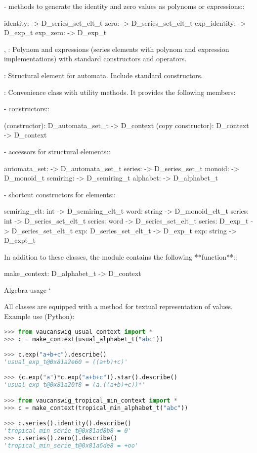       - methods to  generate the identity and zero  values as polynoms
        or expressions::

          identity: -> D\_series\_set\_elt\_t
          zero: -> D\_series\_set\_elt\_t
          exp\_identity: -> D\_exp\_t
          exp\_zero: -> D\_exp\_t

, : 
      Polynom  and  expressions  (series  elements  with  polynom  and
      expression implementations) with standard \Vauc constructors
      and operators.

:
      Structural  element  for  automata. Include  standard  \Vauc
      constructors.

:
      Convenience  class   with  utility  methods.   It  provides  the
      following members:

      - constructors::

         (constructor): D\_automata\_set\_t -> D\_context
         (copy constructor): D\_context -> D\_context

      - accessors for structural elements::

         automata\_set: -> D\_automata\_set\_t
         series: -> D\_series\_set\_t
         monoid: -> D\_monoid\_t
         semiring: -> D\_semiring\_t
         alphabet: -> D\_alphabet\_t

      - shortcut constructors for elements::

         semiring\_elt: int -> D\_semiring\_elt\_t
         word: string -> D\_monoid\_elt\_t
         series: int -> D\_series\_set\_elt\_t
         series: word -> D\_series\_set\_elt\_t
         series: D\_exp\_t -> D\_series\_set\_elt\_t
         exp: D\_series\_set\_elt\_t -> D\_exp\_t
         exp: string -> D\_expt\_t 

In  addition  to these  classes,  the module  
contains the following **function**::

    make\_context: D\_alphabet\_t -> D\_context

Algebra usage
\code{}\code{}\code{}`

All classes are equipped with a  method for
textual representation of values. Example use (Python):

\begin{lstlisting}[language=Python]
>>> from vaucanswig_usual_context import *
>>> c = make_context(usual_alphabet_t("abc"))

>>> c.exp("a+b+c").describe()
'usual_exp_t@0x81a2e60 = ((a+b)+c)'

>>> (c.exp("a")*c.exp("a+b+c")).star().describe()
'usual_exp_t@0x81a20f8 = (a.((a+b)+c))*'

>>> from vaucanswig_tropical_min_context import *
>>> c = make_context(tropical_min_alphabet_t("abc"))

>>> c.series().identity().describe()
'tropical_min_serie_t@0x81ad8b8 = 0'
>>> c.series().zero().describe()
'tropical_min_serie_t@0x81a6de8 = +oo'  
\end{lstlisting}

